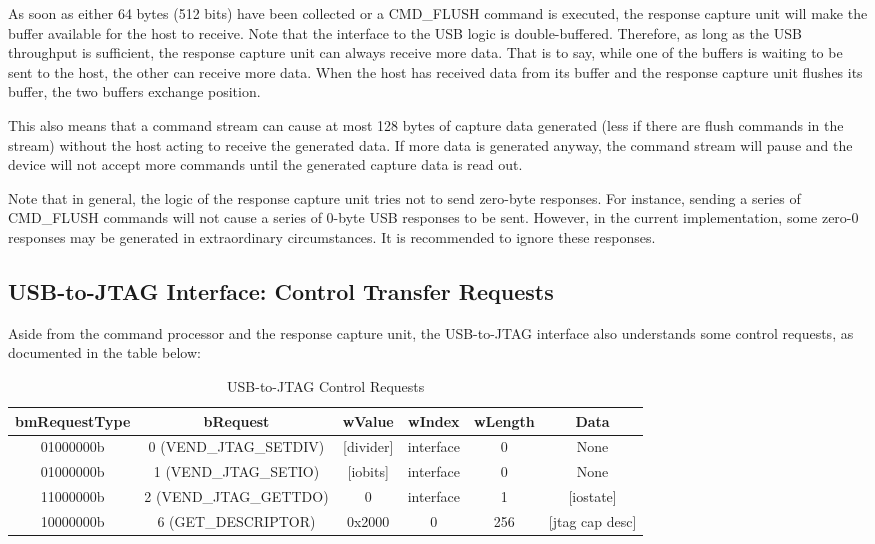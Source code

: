 \documentclass[main\_\_EN.tex]{subfiles}
\begin{document}
As soon as either 64 bytes (512 bits) have been collected or a CMD\_FLUSH command is executed, the response capture unit will make the buffer available for the host to receive. Note that the interface to the USB logic is double-buffered. Therefore, as long as the USB throughput is sufficient, the response capture unit can always receive more data. That is to say, while one of the buffers is waiting to be sent to the host, the other can receive more data. When the host has received data from its buffer and the response capture unit flushes its buffer, the two buffers exchange position.

This also means that a command stream can cause at most 128 bytes of capture data generated (less if there are flush commands in the stream) without the host acting to receive the generated data. If more data is generated anyway, the command stream will pause and the device will not accept more commands until the generated capture data is read out.

Note that in general, the logic of the response capture unit tries not to send zero-byte responses. For instance, sending a series of CMD\_FLUSH commands will not cause a series of 0-byte USB responses to be sent. However, in the current implementation, some zero-0 responses may be generated in extraordinary circumstances. It is recommended to ignore these responses.

\subsection{USB-to-JTAG Interface: Control Transfer Requests}

Aside from the command processor and the response capture unit, the USB-to-JTAG interface also understands some control requests, as documented in the table below:

\begin{table}[H]
    \centering
    \caption{USB-to-JTAG Control Requests}
    \label{tab:usbserialjtag-control-requests}
    \begin{tabular}{|c|c|c|c|c|c|}
    \hline
       \rowcolor{lightgray}
       \textbf{bmRequestType} & \textbf{bRequest} & \textbf{wValue} & \textbf{wIndex} & \textbf{wLength} & \textbf{Data} \\\hline
       
       01000000b &  0 (VEND\_JTAG\_SETDIV) & [divider] & interface & 0 &  None \\\hline
       01000000b &  1 (VEND\_JTAG\_SETIO) &  [iobits] &  interface & 0 &   None \\\hline
       11000000b &  2 (VEND\_JTAG\_GETTDO) & 0 & interface & 1 & [iostate] \\\hline
       10000000b &  6 (GET\_DESCRIPTOR) &   0x2000 &  0 &  256 & [jtag cap desc] \\\hline
    \end{tabular}
\end{table}
\end{document}

